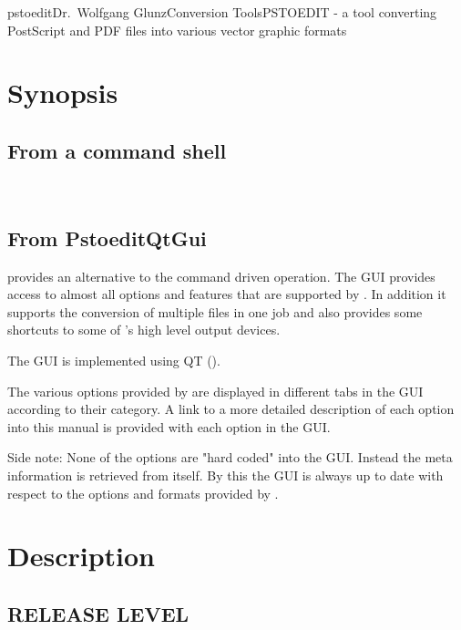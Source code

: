\documentclass[english,a4paper]{article}
\newcommand{\Anchor}[1]{\hypertarget{#1}{}}
\begin{document}
\begin{Name}{1}{pstoedit}{Dr.\ Wolfgang Glunz}{Conversion Tools}{PSTOEDIT}
   - a tool converting PostScript and PDF files into various
  vector graphic formats
\end{Name}

\section{Synopsis}

\subsection{From a command shell}

 
\\



\Anchor{GUI}
\subsection{From PstoeditQtGui}

 provides an alternative to the command driven operation.
The GUI provides access to almost all options and features that are supported by .
In addition it supports the conversion of multiple files in one job and also provides some 
shortcuts to some of 's high level output devices.

The GUI is implemented using QT ().

The various options provided by  are displayed in different tabs in the GUI according to their category.
A link to a more detailed description of each option into this manual is provided with each option in the GUI.

Side note: None of the options are "hard coded" into the GUI. Instead the meta information is retrieved from  itself.
By this the GUI is always up to date with respect to the options and formats provided by .

\section{Description}

\subsection{RELEASE LEVEL}
\end{document}
